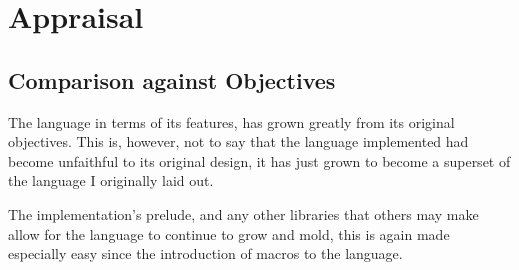 \documentclass{article}
\begin{document}
\clearpage

\section{Appraisal}
  \subsection{Comparison against Objectives}
    The language in terms of its features, has grown greatly from its original
    objectives. This is, however, not to say that the language implemented had become
    unfaithful to its original design, it has just grown to become a superset
    of the language I originally laid out.

    The implementation's prelude, and any other libraries that others
    may make allow for the language to continue to grow and mold, this is
    again made especially easy since the introduction of macros to the language.
\end{document}
